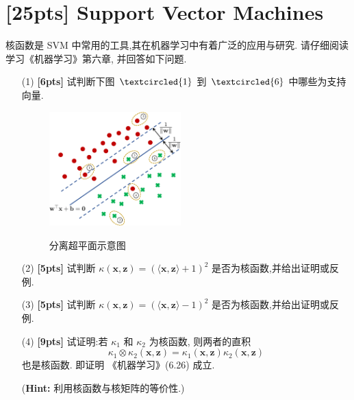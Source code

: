 \documentclass[a4paper,UTF8]{article}
\numberwithin{equation}{section}
\theoremstyle{definition}
\def \x {\boldsymbol{x}}
\def \z {\mathbf{z}}
\begin{document}
\newpage
\section{[25pts] Support Vector Machines}
核函数是 SVM 中常用的工具,其在机器学习中有着广泛的应用与研究. 请仔细阅读学习《机器学习》第六章, 并回答如下问题.
\begin{enumerate}
	\item[(1)] \textbf{[6pts]} 试判断下图 $\textcircled{1}$ 到 $\textcircled{6}$ 中哪些为支持向量.
        \begin{figure}[!htbp]
		\centering
			\includegraphics[width=0.48\textwidth]{svm.pdf}\\
			\caption{分离超平面示意图}
	\end{figure}
        \item[(2)] \textbf{[5pts]} 试判断 $\kappa(\x, \z) = \left(\langle\x, \z\rangle + 1\right)^2$ 是否为核函数,并给出证明或反例.
        \item[(3)] \textbf{[5pts]} 试判断 $\kappa(\x, \z) = \left(\langle\x, \z\rangle - 1\right)^2$ 是否为核函数,并给出证明或反例.
	\item[(4)] \textbf{[9pts]} 试证明:若 $\kappa_1$ 和 $\kappa_2$ 为核函数, 则两者的直积
	\[
	\kappa_1 \otimes \kappa_2(\x, \z)=\kappa_1(\x, \z) \kappa_2(\x, \z)
	\]
	也是核函数. 即证明 《机器学习》(6.26) 成立.

 (\textbf{Hint:} 利用核函数与核矩阵的等价性.)

	
\end{enumerate}
\end{document}
